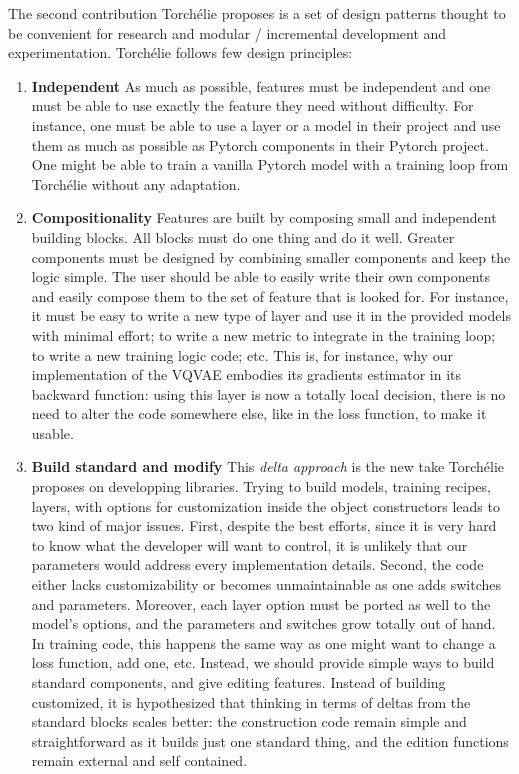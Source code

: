 The second contribution Torchélie proposes is a set of design patterns thought to be convenient for research and modular / incremental development and experimentation. Torchélie follows few design principles:

\begin{enumerate}
    \item \textbf{Independent} As much as possible, features must be independent and one must be able to use exactly the feature they need without difficulty. For instance, one must be able to use a layer or a model in their project and use them as much as possible as Pytorch components in their Pytorch project. One might be able to train a vanilla Pytorch model with a training loop from Torchélie without any adaptation.
    
    \item \textbf{Compositionality} Features are built by composing small and independent building blocks. All blocks must do one thing and do it well. Greater components must be designed by combining smaller components and keep the logic simple. The user should be able to easily write their own components and easily compose them to the set of feature that is looked for. For instance, it must be easy to write a new type of layer and use it in the provided models with minimal effort; to write a new metric to integrate in the training loop; to write a new training logic code; etc. This is, for instance, why our implementation of the VQVAE embodies its gradients estimator in its backward function: using this layer is now a totally local decision, there is no need to alter the code somewhere else, like in the loss function, to make it usable. 
    
    \item \textbf{Build standard and modify} This \emph{delta approach} is the new take Torchélie proposes on developping libraries. Trying to build models, training recipes, layers, with options for customization inside the object constructors leads to two kind of major issues. First, despite the best efforts, since it is very hard to know what the developer will want to control, it is unlikely that our parameters would address every implementation details. Second, the code either lacks customizability or becomes unmaintainable as one adds switches and parameters. Moreover, each layer option must be ported as well to the model's options, and the parameters and switches grow totally out of hand. In training code, this happens the same way as one might want to change a loss function, add one, etc. Instead, we should provide simple ways to build standard components, and give editing features. Instead of building customized, it is hypothesized that thinking in terms of deltas from the standard blocks scales better: the construction code remain simple and straightforward as it builds just one standard thing, and the edition functions remain external and self contained.
    

\end{enumerate}
